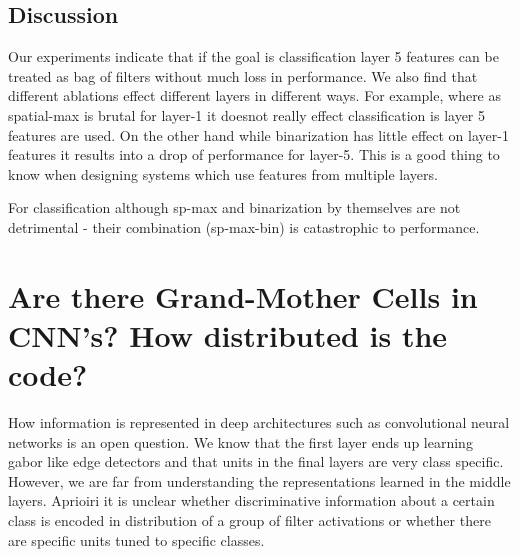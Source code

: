 \documentclass[runningheads]{llncs}
\begin{document}
\setlength{\tabcolsep}{1pt}
\begin{table}[t!]
\begin{center}
\caption{Effect of various feature ablations on object detection using R-CNN\cite{Rcnn}.}
\label{table:det-ablation}
\end{center}
\end{table}
\setlength{\tabcolsep}{1.4pt}



\subsection{Discussion}
Our experiments indicate that if the goal is classification layer 5 features can be treated as bag of filters without much loss in performance. We also find that different ablations effect different layers in different ways. For example, where as spatial-max is brutal for layer-1 it doesnot really effect classification is layer 5 features are used. On the other hand while binarization has little effect on layer-1 features it results into a drop of performance for layer-5. This is a good thing to know when designing systems which use features from multiple layers.

For classification although sp-max and binarization by themselves are not detrimental - their combination (sp-max-bin) is catastrophic to performance.

\section{Are there Grand-Mother Cells in CNN's? How distributed is the code?}
\label{sec:grand-mother}
How information is represented in deep architectures such as convolutional neural networks is an open question. We know that the first layer ends up learning gabor like edge detectors and that units in the final layers are very class specific. However, we are far from understanding the representations learned in the middle layers. Aprioiri it is unclear whether discriminative information about a certain class is encoded in distribution of a group of filter activations or whether there are specific units tuned to specific classes.
\end{document}
